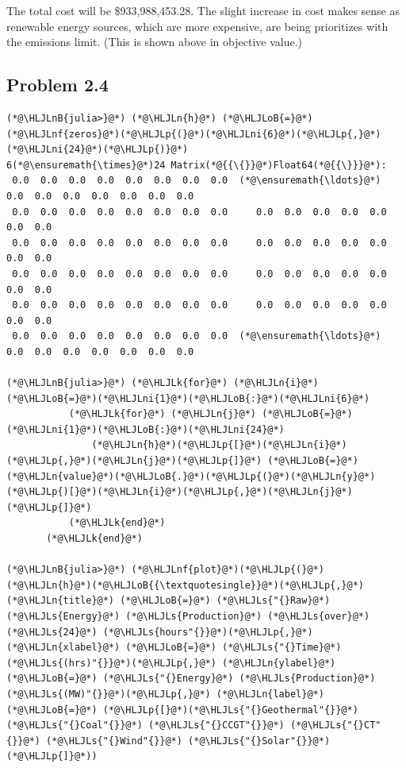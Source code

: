 \documentclass[12pt,a4paper]{article}
\newcommand{\HLJLk}[1]{\textcolor[RGB]{148,91,176}{\textbf{#1}}}
\newcommand{\HLJLn}[1]{#1}
\newcommand{\HLJLnf}[1]{\textcolor[RGB]{66,102,213}{#1}}
\newcommand{\HLJLs}[1]{\textcolor[RGB]{201,61,57}{#1}}
\newcommand{\HLJLnB}[1]{\textcolor[RGB]{59,151,46}{#1}}
\newcommand{\HLJLni}[1]{\textcolor[RGB]{59,151,46}{#1}}
\newcommand{\HLJLoB}[1]{\textcolor[RGB]{102,102,102}{\textbf{#1}}}
\newcommand{\HLJLp}[1]{#1}
\begin{document}
The total cost will be \$933,988,453.28. The slight increase in cost makes sense as renewable energy sources, which are more expensive, are being prioritizes with the emissions limit.  (This is shown above in objective value.)

\subsection{Problem 2.4}

\begin{lstlisting}
(*@\HLJLnB{julia>}@*) (*@\HLJLn{h}@*) (*@\HLJLoB{=}@*) (*@\HLJLnf{zeros}@*)(*@\HLJLp{(}@*)(*@\HLJLni{6}@*)(*@\HLJLp{,}@*)(*@\HLJLni{24}@*)(*@\HLJLp{)}@*)
6(*@\ensuremath{\times}@*)24 Matrix(*@{{\{}}@*)Float64(*@{{\}}}@*):
 0.0  0.0  0.0  0.0  0.0  0.0  0.0  0.0  (*@\ensuremath{\ldots}@*)  0.0  0.0  0.0  0.0  0.0  0.0  0.0
 0.0  0.0  0.0  0.0  0.0  0.0  0.0  0.0     0.0  0.0  0.0  0.0  0.0  0.0  0.0
 0.0  0.0  0.0  0.0  0.0  0.0  0.0  0.0     0.0  0.0  0.0  0.0  0.0  0.0  0.0
 0.0  0.0  0.0  0.0  0.0  0.0  0.0  0.0     0.0  0.0  0.0  0.0  0.0  0.0  0.0
 0.0  0.0  0.0  0.0  0.0  0.0  0.0  0.0     0.0  0.0  0.0  0.0  0.0  0.0  0.0
 0.0  0.0  0.0  0.0  0.0  0.0  0.0  0.0  (*@\ensuremath{\ldots}@*)  0.0  0.0  0.0  0.0  0.0  0.0  0.0

(*@\HLJLnB{julia>}@*) (*@\HLJLk{for}@*) (*@\HLJLn{i}@*) (*@\HLJLoB{=}@*)(*@\HLJLni{1}@*)(*@\HLJLoB{:}@*)(*@\HLJLni{6}@*)
           (*@\HLJLk{for}@*) (*@\HLJLn{j}@*) (*@\HLJLoB{=}@*) (*@\HLJLni{1}@*)(*@\HLJLoB{:}@*)(*@\HLJLni{24}@*)
               (*@\HLJLn{h}@*)(*@\HLJLp{[}@*)(*@\HLJLn{i}@*)(*@\HLJLp{,}@*)(*@\HLJLn{j}@*)(*@\HLJLp{]}@*) (*@\HLJLoB{=}@*) (*@\HLJLn{value}@*)(*@\HLJLoB{.}@*)(*@\HLJLp{(}@*)(*@\HLJLn{y}@*)(*@\HLJLp{)[}@*)(*@\HLJLn{i}@*)(*@\HLJLp{,}@*)(*@\HLJLn{j}@*)(*@\HLJLp{]}@*)
           (*@\HLJLk{end}@*)
       (*@\HLJLk{end}@*)

(*@\HLJLnB{julia>}@*) (*@\HLJLnf{plot}@*)(*@\HLJLp{(}@*)(*@\HLJLn{h}@*)(*@\HLJLoB{{\textquotesingle}}@*)(*@\HLJLp{,}@*)(*@\HLJLn{title}@*) (*@\HLJLoB{=}@*) (*@\HLJLs{"{}Raw}@*) (*@\HLJLs{Energy}@*) (*@\HLJLs{Production}@*) (*@\HLJLs{over}@*) (*@\HLJLs{24}@*) (*@\HLJLs{hours"{}}@*)(*@\HLJLp{,}@*) (*@\HLJLn{xlabel}@*) (*@\HLJLoB{=}@*) (*@\HLJLs{"{}Time}@*) (*@\HLJLs{(hrs)"{}}@*)(*@\HLJLp{,}@*) (*@\HLJLn{ylabel}@*) (*@\HLJLoB{=}@*) (*@\HLJLs{"{}Energy}@*) (*@\HLJLs{Production}@*) (*@\HLJLs{(MW)"{}}@*)(*@\HLJLp{,}@*) (*@\HLJLn{label}@*)(*@\HLJLoB{=}@*) (*@\HLJLp{[}@*)(*@\HLJLs{"{}Geothermal"{}}@*) (*@\HLJLs{"{}Coal"{}}@*) (*@\HLJLs{"{}CCGT"{}}@*) (*@\HLJLs{"{}CT"{}}@*) (*@\HLJLs{"{}Wind"{}}@*) (*@\HLJLs{"{}Solar"{}}@*)(*@\HLJLp{]}@*))
\end{lstlisting}
\end{document}
